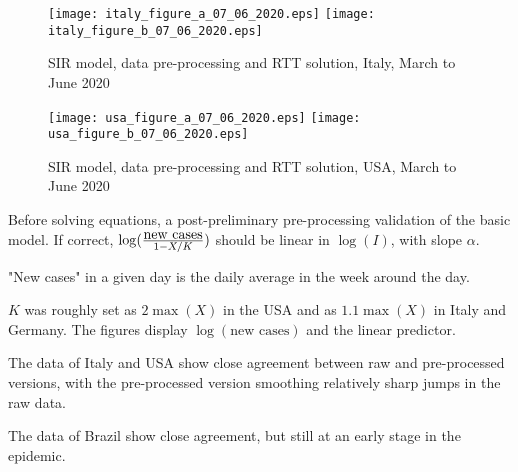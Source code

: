 \documentclass{article}
\begin{document}
\begin{figure}
\begin{center}
{\texttt{[image: italy\_figure\_a\_07\_06\_2020.eps]}}
\qquad
{\texttt{[image: italy\_figure\_b\_07\_06\_2020.eps]}}
\end{center}
\begin{center}
\caption{SIR model, data pre-processing and RTT solution, Italy, March to June 2020
}
\label{fig:italy_sir_model_07_06_2020}
\end{center}
\end{figure}


\begin{figure}
\begin{center}
{\texttt{[image: usa\_figure\_a\_07\_06\_2020.eps]}}
\qquad
{\texttt{[image: usa\_figure\_b\_07\_06\_2020.eps]}}
\end{center}
\begin{center}
\caption{SIR model, data pre-processing and RTT solution, USA, March to June 2020
}
\label{fig:usa_sir_model_07_06_2020}
\end{center}
\end{figure}

\newpage

\noindent Before solving equations, a post-preliminary pre-processing validation of the basic model. If correct, $\log({{\mbox{new cases}} \over {1-X/K}})$ should be linear in $\log(I)$, with slope $\alpha$.

\bigskip

\noindent "New cases" in a given day is the daily average in the week around the day.

\bigskip

\noindent $K$ was roughly set as $2 \max(X)$ in the USA and as $1.1 \max(X)$ in Italy and Germany. The figures display $\log(\mbox{new cases})$ and the linear predictor.

\newpage

\noindent The data of Italy and USA show close agreement between raw and pre-processed versions, with the pre-processed version smoothing relatively sharp jumps in the raw data.

\bigskip

\noindent The data of Brazil show close agreement, but still at an early stage in the epidemic.
\end{document}

